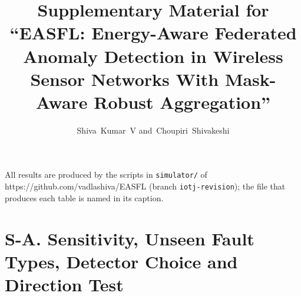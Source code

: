 \documentclass[journal,onecolumn]{IEEEtran}
\begin{document}
\title{Supplementary Material for ``EASFL: Energy-Aware Federated Anomaly Detection in Wireless Sensor Networks With Mask-Aware Robust Aggregation''}
\author{Shiva~Kumar~V and~Choupiri~Shivakeshi}
\maketitle\renewcommand{\thetable}{S\arabic{table}}\renewcommand{\thefigure}{S\arabic{figure}}
All results are produced by the scripts in \texttt{simulator/} of https://github.com/vadlashiva/EASFL (branch \texttt{iotj-revision}); the file that produces each table is named in its caption.

\section*{S-A. Sensitivity, Unseen Fault Types, Detector Choice and Direction Test}
\end{document}
